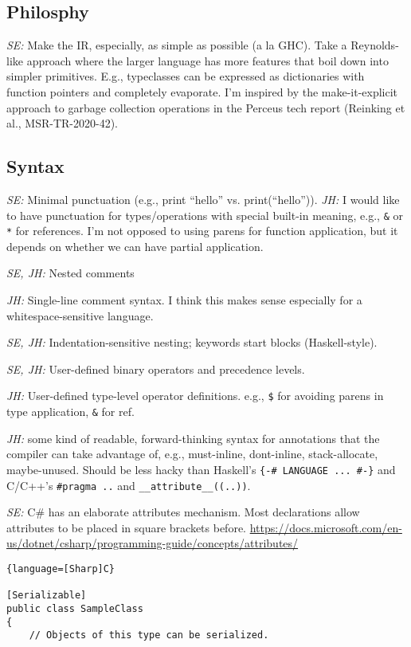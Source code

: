 \documentclass{article}
\begin{document}
\subsection{Philosphy}

\textit{SE:} Make the IR, especially, as simple as possible (a la
GHC). Take a Reynolds-like approach where the larger language has more
features that boil down into simpler primitives.  E.g., typeclasses
can be expressed as dictionaries with function pointers and completely
evaporate.  I'm inspired by the make-it-explicit approach to garbage
collection operations in the Perceus tech report (Reinking et al.,
MSR-TR-2020-42).

\subsection{Syntax}

\textit{SE:} Minimal punctuation (e.g., print ``hello'' vs. print(``hello'')).
\textit{JH:} I would like to have punctuation for types/operations with special
built-in meaning, e.g., \verb|&| or \verb|*| for references. I'm not opposed to
using parens for function application, but it depends on whether we can have
partial application.

\textit{SE, JH:} Nested comments

\textit{JH:} Single-line comment syntax. I think this makes sense especially for
a whitespace-sensitive language.

\textit{SE, JH:} Indentation-sensitive nesting; keywords start blocks (Haskell-style).

\textit{SE, JH:} User-defined binary operators and precedence levels.

\textit{JH:} User-defined type-level operator definitions. e.g., \verb|$| for
avoiding parens in type application, \verb|&| for ref.

\textit{JH:} some kind of readable, forward-thinking syntax for annotations that
the compiler can take advantage of, e.g., must-inline, dont-inline,
stack-allocate, maybe-unused. Should be less hacky than Haskell's
\verb|{-# LANGUAGE ... #-}| and C/C++'s \verb|#pragma ..| and
\verb|__attribute__((..))|.

\textit{SE:} C\# has an elaborate attributes mechanism.
Most declarations allow attributes to be placed in square brackets before.  \url{https://docs.microsoft.com/en-us/dotnet/csharp/programming-guide/concepts/attributes/}

\begin{lstlisting}{language=[Sharp]C}
 
[Serializable]
public class SampleClass
{
    // Objects of this type can be serialized.
 
\end{lstlisting}
\end{document}

